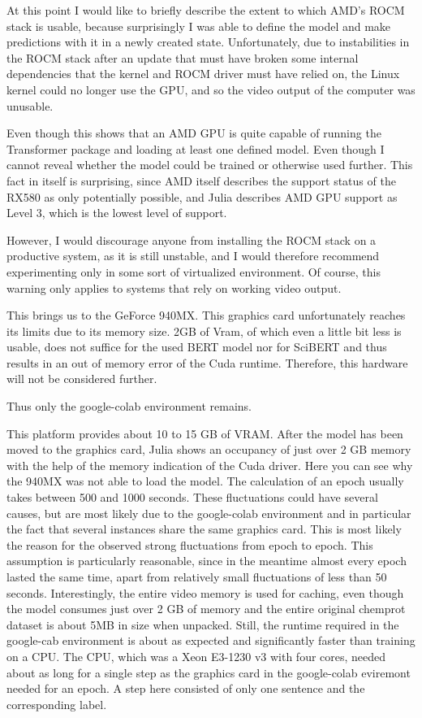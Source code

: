 At this point I would like to briefly describe the extent to which AMD's ROCM stack is usable, because surprisingly I was able to define the model and make predictions with it in a newly created state. Unfortunately, due to instabilities in the ROCM stack after an update that must have broken some internal dependencies that the kernel and ROCM driver must have relied on, the Linux kernel could no longer use the GPU, and so the video output of the computer was unusable.

Even though this shows that an AMD GPU is quite capable of running the Transformer package and loading at least one defined model. Even though I cannot reveal whether the model could be trained or otherwise used further. This fact in itself is surprising, since AMD itself describes the support status of the RX580 as only potentially possible, and Julia describes AMD GPU support as Level 3, which is the lowest level of support.

However, I would discourage anyone from installing the ROCM stack on a productive system, as it is still unstable, and I would therefore recommend experimenting only in some sort of virtualized environment. Of course, this warning only applies to systems that rely on working video output.    

This brings us to the GeForce 940MX. This graphics card unfortunately reaches its limits due to its memory size. 2GB of Vram, of which even a little bit less is usable, does not suffice for the used BERT model nor for SciBERT and thus results in an out of memory error of the Cuda runtime. Therefore, this hardware will not be considered further. 

Thus only the google-colab environment remains. 

This platform provides about 10 to 15 GB of VRAM. After the model has been moved to the graphics card, Julia shows an occupancy of just over 2 GB memory with the help of the memory indication of the Cuda driver. Here you can see why the 940MX was not able to load the model. The calculation of an epoch usually takes between 500 and 1000 seconds. These fluctuations could have several causes, but are most likely due to the google-colab environment and in particular the fact that several instances share the same graphics card. This is most likely the reason for the observed strong fluctuations from epoch to epoch. This assumption is particularly reasonable, since in the meantime almost every epoch lasted the same time, apart from relatively small fluctuations of less than 50 seconds. Interestingly, the entire video memory is used for caching, even though the model consumes just over 2 GB of memory and the entire original chemprot dataset is about 5MB in size when unpacked. Still, the runtime required in the google-cab environment is about as expected and significantly faster than training on a CPU. The CPU, which was a Xeon E3-1230 v3 with four cores, needed about as long for a single step as the graphics card in the google-colab eviremont needed for an epoch. A step here consisted of only one sentence and the corresponding label.
 
